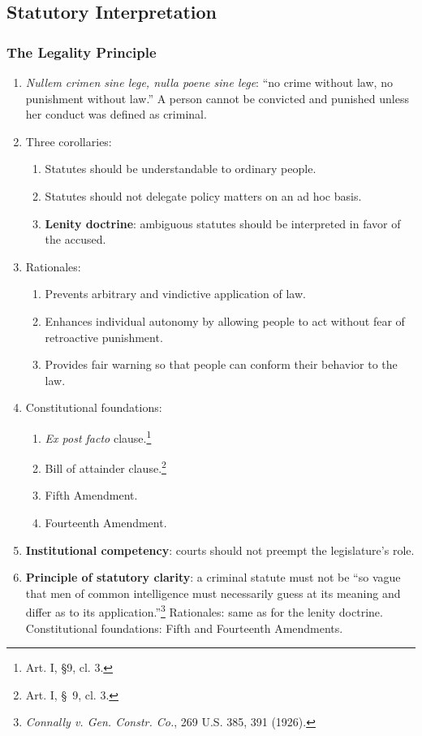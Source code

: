 \subsection{Statutory Interpretation}

\subsubsection{The Legality Principle}

\begin{enumerate}
    \item \emph{Nullem crimen sine lege, nulla poene sine lege}: ``no crime 
    without law, no punishment without law.'' A person cannot be convicted and 
    punished unless her conduct was defined as criminal.
    \item Three corollaries:
    \begin{enumerate}
        \item Statutes should be understandable to ordinary people.
        \item Statutes should not delegate policy matters on an ad hoc basis.
        \item \textbf{Lenity doctrine}: ambiguous statutes should be 
        interpreted in favor of the accused.
    \end{enumerate}
    \item Rationales:
    \begin{enumerate}
        \item Prevents arbitrary and vindictive application of law.
        \item Enhances individual autonomy by allowing people to act without 
        fear of retroactive punishment.
        \item Provides fair warning so that people can conform their behavior 
        to the law.
    \end{enumerate}
    \item Constitutional foundations:
    \begin{enumerate}
        \item \emph{Ex post facto} clause.\footnote{Art. I, \S 9, cl. 3.}
        \item Bill of attainder clause.\footnote{Art. I, \S\ 9, cl. 3.}
        \item Fifth Amendment.
        \item Fourteenth Amendment.
    \end{enumerate}
    \item \textbf{Institutional competency}: courts should not preempt the 
    legislature's role.
    \item \textbf{Principle of statutory clarity}: a criminal statute must not be ``so 
    vague that men of common intelligence must necessarily guess at its 
    meaning and differ as to its application.''\footnote{\emph{Connally v. 
    Gen. Constr. Co.}, 269 U.S. 385, 391 (1926).} Rationales: same as for the 
    lenity doctrine. Constitutional foundations: Fifth and Fourteenth 
    Amendments.
\end{enumerate}

